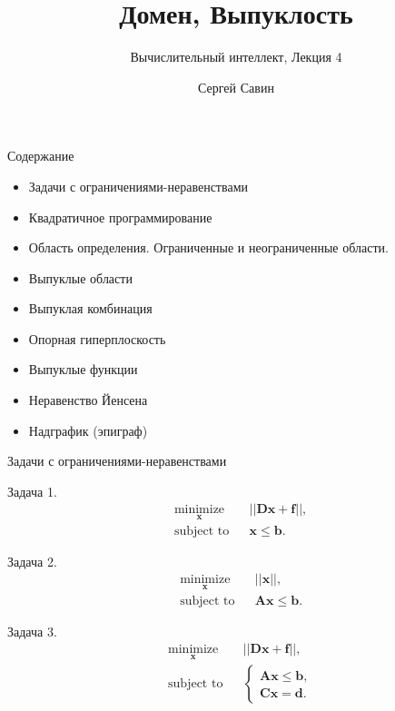\documentclass{beamer}
\title{Домен, Выпуклость}
\subtitle{Вычислительный интеллект, Лекция 4}
\author{Сергей Савин}
\date{\mydate}
\begin{document}
\maketitle


\begin{frame}{Содержание}
	
	\begin{itemize}
		\item Задачи с ограничениями-неравенствами
		\item Квадратичное программирование
		\item Область определения. Ограниченные и неограниченные области.
		\item Выпуклые области
		\item Выпуклая комбинация
		\item Опорная гиперплоскость
		\item Выпуклые функции
		\item Неравенство Йенсена
		\item Надграфик (эпиграф)
	\end{itemize}
	
\end{frame}

\begin{frame}{Задачи с ограничениями-неравенствами}
	\begin{flushleft}
		
		Задача 1.
		\begin{equation}
			\begin{aligned}
				& \underset{\mathbf{x}}{\text{minimize}}
				& & || \mathbf{D}\mathbf{x} + \mathbf{f} ||, \\
				& \text{subject to}
				& & \mathbf{x} \leq \mathbf{b}.
			\end{aligned}
		\end{equation}
		
		Задача 2.
		\begin{equation}
			\begin{aligned}
				& \underset{\mathbf{x}}{\text{minimize}}
				& & || \mathbf{x} ||, \\
				& \text{subject to}
				& & \mathbf{A}\mathbf{x} \leq \mathbf{b}.
			\end{aligned}
		\end{equation}
		
		Задача 3.
		\begin{equation}
			\begin{aligned}
				& \underset{\mathbf{x}}{\text{minimize}}
				& & || \mathbf{D}\mathbf{x} + \mathbf{f} ||, \\
				& \text{subject to}
				& & \begin{cases}
					\mathbf{A}\mathbf{x} \leq \mathbf{b}, \\
					\mathbf{C}\mathbf{x} = \mathbf{d}.
				\end{cases}
			\end{aligned}
		\end{equation}
		
	\end{flushleft}
\end{frame}
\end{document}
